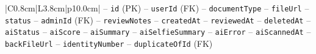\begin{center}
\begin{longtable}{|C{0.8cm}|L{3.8cm}|p{10.0cm}|}
\hspace*{1em}-- \texttt{id} (PK) \newline
\hspace*{1em}-- \texttt{user\allowbreak Id} (FK) \newline
\hspace*{1em}-- \texttt{document\allowbreak Type} \newline
\hspace*{1em}-- \texttt{file\allowbreak Url} \newline
\hspace*{1em}-- \texttt{status} \newline
\hspace*{1em}-- \texttt{admin\allowbreak Id} (FK) \newline
\hspace*{1em}-- \texttt{review\allowbreak Notes} \newline
\hspace*{1em}-- \texttt{created\allowbreak At} \newline
\hspace*{1em}-- \texttt{reviewed\allowbreak At} \newline
\hspace*{1em}-- \texttt{deleted\allowbreak At} \newline
\hspace*{1em}-- \texttt{ai\allowbreak Status} \newline
\hspace*{1em}-- \texttt{ai\allowbreak Score} \newline
\hspace*{1em}-- \texttt{ai\allowbreak Summary} \newline
\hspace*{1em}-- \texttt{ai\allowbreak Selfie\allowbreak Summary} \newline
\hspace*{1em}-- \texttt{ai\allowbreak Error} \newline
\hspace*{1em}-- \texttt{ai\allowbreak Scanned\allowbreak At} \newline
\hspace*{1em}-- \texttt{back\allowbreak File\allowbreak Url} \newline
\hspace*{1em}-- \texttt{identity\allowbreak Number} \newline
\hspace*{1em}-- \texttt{duplicate\allowbreak Of\allowbreak Id} (FK) \\
\hline
\end{longtable}\addtocounter{table}{-1}
\end{center}

